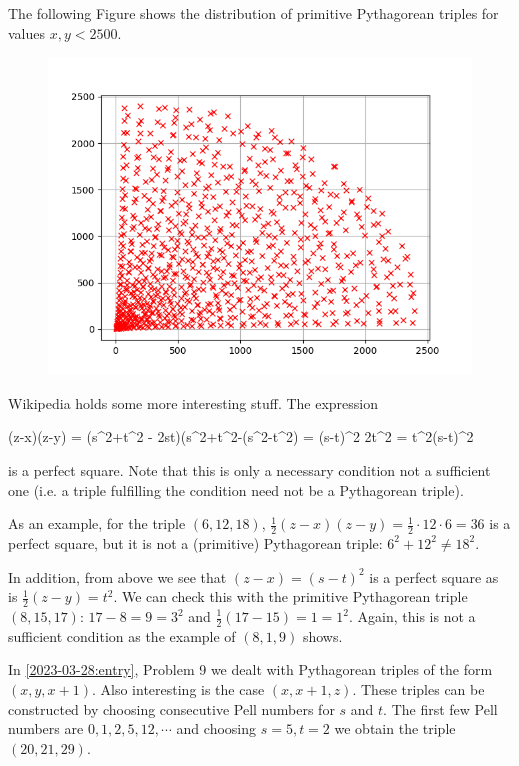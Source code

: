 
The following Figure shows the distribution of primitive Pythagorean triples for values $x, y < 2500$.

\begin{figure}[H]
    \centering
    \includegraphics[scale=0.75]{images/2023-03-28-triples_2.png}
\end{figure}


Wikipedia holds some more interesting stuff. The expression

\bee
{}(z-x)(z-y) = (s^2+t^2 - 2st)(s^2+t^2-(s^2-t^2) =  (s-t)^2 2t^2 = t^2(s-t)^2
\eee

is a perfect square. Note that this is only a necessary condition not a sufficient one (i.e. a triple fulfilling the condition need not be a Pythagorean triple).

As an example, for the triple $(6, 12, 18)$, $\frac{1}{2}(z-x)(z-y) = \frac{1}{2} \cdot 12 \cdot 6 = 36$ is a perfect square, but it is not a (primitive) Pythagorean triple: $6^2 + 12^2 \neq 18^2$.

In addition, from above we see that $(z-x) = (s-t)^2$ is a perfect square as is $\frac{1}{2}(z-y) = t^2$. We can check this with the primitive Pythagorean triple $(8, 15, 17)$: $17 - 8 = 9 = 3^2$ and $\frac{1}{2} (17-15) = 1 = 1^2$. Again, this is not a sufficient condition as the example of $(8, 1, 9)$ shows.

In \ref{2023-03-28:entry}, Problem 9 we dealt with Pythagorean triples of the form $(x, y, x+1)$. Also interesting is the case $(x, x+1, z)$. These triples can be constructed by choosing consecutive Pell numbers for $s$ and $t$. The first few Pell numbers are $0, 1, 2, 5, 12, \cdots$ and choosing $s = 5, t=2$ we obtain the triple $(20, 21, 29)$.

